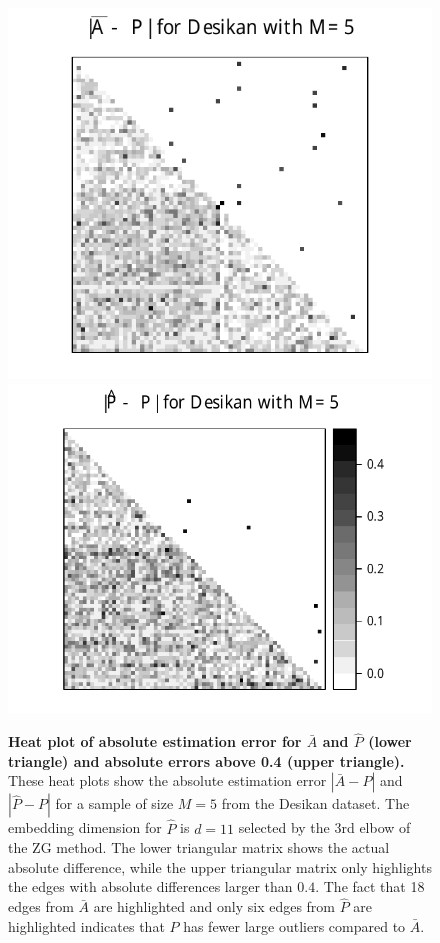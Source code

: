\documentclass[10pt,letterpaper]{article}
\renewcommand{\hat}{\widehat}
\begin{document}
\begin{figure}

\begin{center}
  \includegraphics[height=.4\linewidth]{Diff2_desikan_m5.pdf}\hspace{-12pt}
  \includegraphics[height=.4\linewidth]{Diff3_desikan_m5.pdf}
\end{center}

\caption{{\bf Heat plot of absolute estimation error for $\bar{A}$ and $\hat{P}$ (lower triangle) and absolute errors above 0.4 (upper triangle).}
These heat plots show the absolute estimation error $|\bar{A} - P|$ and $|\hat{P} - P|$ for a sample of size $M=5$ from the Desikan dataset.
The embedding dimension for $\hat{P}$ is $d=11$ selected by the 3rd elbow of the ZG method. The lower triangular matrix shows the actual absolute difference, while the upper triangular matrix only highlights the edges with absolute differences larger than $0.4$. The fact that 18 edges from $\bar{A}$ are highlighted and only six edges from $\hat{P}$ are highlighted indicates that $\hat{P}$ has fewer large outliers compared to $\bar{A}$.
}
\label{fig:Diff_desikan_m5}
\end{figure}
\end{document}
